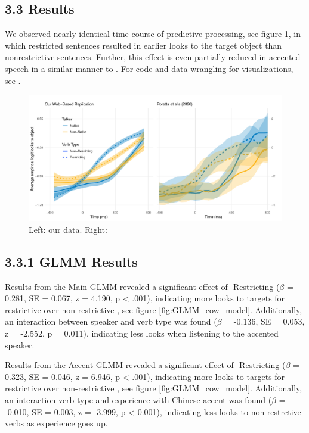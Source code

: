 

\subsection{3.3 Results}

 We observed nearly identical time course of predictive processing, see figure \ref{fig:smooth}, in which restricted sentences resulted in earlier looks to the target object than nonrestrictive sentences. Further, this effect is even partially reduced in accented speech in a similar manner to \textcite{Porretta_et_al_2020}. For  code and data wrangling for visualizations, see .

\begin{figure}[h]
    \centering
    \includegraphics[width=\textwidth]{figures/smooth_comparison_plot.pdf}
    \caption{Left: our data. Right: \textcite{Porretta_et_al_2020}}
    \label{fig:smooth}
\end{figure}

\subsection{3.3.1 GLMM Results}
Results from the Main GLMM revealed a significant effect of  -Restricting  ($\beta$ = 0.281, SE = 0.067, z = 4.190, p < .001), indicating more looks to targets for restrictive  over non-restrictive , see figure \ref{fig:GLMM_cow_model}. Additionally, an interaction between speaker and verb type was found ($\beta$ = -0.136, SE = 0.053, z = -2.552, p = 0.011), indicating less looks when listening to the accented speaker.

Results from the Accent GLMM revealed a significant effect of  -Restricting  ($\beta$ = 0.323, SE = 0.046, z = 6.946, p < .001), indicating more looks to targets for restrictive  over non-restrictive , see figure \ref{fig:GLMM_cow_model}. Additionally, an interaction verb type and experience with Chinese accent was found ($\beta$ = -0.010, SE = 0.003, z = -3.999, p < 0.001), indicating less looks to non-restrctive verbs as experience goes up.

